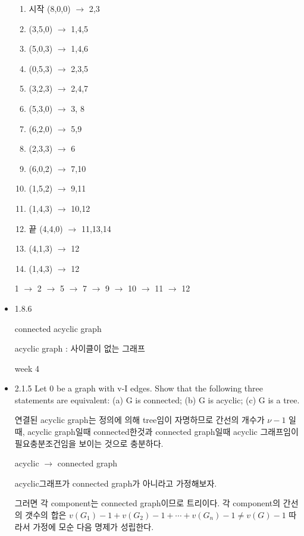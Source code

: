 \documentclass{oblivoir}
\begin{document}
\begin{itemize}
    \begin{enumerate}
        \item 시작 (8,0,0) $\rightarrow$ 2,3
        \item (3,5,0) $\rightarrow$ 1,4,5
        \item (5,0,3) $\rightarrow$ 1,4,6
        \item (0,5,3) $\rightarrow$ 2,3,5
        \item (3,2,3) $\rightarrow$ 2,4,7
        \item (5,3,0) $\rightarrow$ 3, 8
        \item (6,2,0) $\rightarrow$ 5,9
        \item (2,3,3) $\rightarrow$ 6
        \item (6,0,2) $\rightarrow$ 7,10
        \item (1,5,2) $\rightarrow$ 9,11
        \item (1,4,3) $\rightarrow$ 10,12
        \item 끝 (4,4,0) $\rightarrow$ 11,13,14
        \item (4,1,3) $\rightarrow$ 12
        \item (1,4,3) $\rightarrow$ 12
    \end{enumerate} 
    1 $\rightarrow$ 2 $\rightarrow$ 5 $\rightarrow$ 7 $\rightarrow$ 9 $\rightarrow$ 10 $\rightarrow$ 11 $\rightarrow$ 12

    \item 1.8.6
    \begin{dfn}[tree] connected acyclic graph

        acyclic graph : 사이클이 없는 그래프
    \end{dfn}

    week 4
    \item  2.1.5
    Let 0 be a graph with v-I edges. Show that the following three statements are equivalent: 
    (a) G is connected;
    (b) G is acyclic;
    (c) G is a tree.

    연결된 acyclic graph는 정의에 의해 tree임이 자명하므로 간선의 개수가 $\nu -1$  일때, acyclic graph일때 connected한것과 connected graph일때 acyclic 그래프임이 필요충분조건임을 보이는 것으로 충분하다.

    acyclic $\rightarrow$ connected graph

    acyclic그래프가 connected graph가 아니라고 가정해보자.

    그러면 각 component는 connected graph이므로 트리이다.
    각 component의 간선의 갯수의 합은 $v(G_1)-1 + v(G_2)-1 + \cdots + v(G_n)-1 \neq v(G)-1 $
    따라서 가정에 모순 다음 명제가 성립한다.


\end{itemize}
\end{document}
